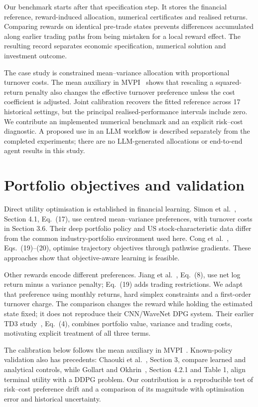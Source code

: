 \documentclass[sigconf,review]{acmart}
\begin{document}
Our benchmark starts after that specification step. It stores the financial reference, reward-induced allocation, numerical certificates and realised returns. Comparing rewards on identical pre-trade states prevents differences accumulated along earlier trading paths from being mistaken for a local reward effect. The resulting record separates economic specification, numerical solution and investment outcome.

The case study is constrained mean--variance allocation with proportional turnover costs. The mean auxiliary in MVPI\ \cite{zhang2021} shows that rescaling a squared-return penalty also changes the effective turnover preference unless the cost coefficient is adjusted. Joint calibration recovers the fitted reference across 17 historical settings, but the principal realised-performance intervals include zero. We contribute an implemented numerical benchmark and an explicit risk--cost diagnostic. A proposed use in an LLM workflow is described separately from the completed experiments; there are no LLM-generated allocations or end-to-end agent results in this study.

\section{Portfolio objectives and validation}
Direct utility optimisation is established in financial learning. Simon et al.\ \cite{simon2026}, Section 4.1, Eq.\ (17), use centred mean--variance preferences, with turnover costs in Section 3.6. Their deep portfolio policy and US stock-characteristic data differ from the common industry-portfolio environment used here. Cong et al.\ \cite{cong2026}, Eqs.\ (19)--(20), optimise trajectory objectives through pathwise gradients. These approaches show that objective-aware learning is feasible.

Other rewards encode different preferences. Jiang et al.\ \cite{jiang2025}, Eq.\ (8), use net log return minus a variance penalty; Eq.\ (19) adds trading restrictions. We adapt that preference using monthly returns, hard simplex constraints and a first-order turnover charge. The comparison changes the reward while holding the estimated state fixed; it does not reproduce their CNN/WaveNet DPG system. Their earlier TD3 study\ \cite{jiang2024}, Eq.\ (4), combines portfolio value, variance and trading costs, motivating explicit treatment of all three terms.

The calibration below follows the mean auxiliary in MVPI\ \cite{zhang2021}. Known-policy validation also has precedents: Chaouki et al.\ \cite{chaouki2020}, Section 3, compare learned and analytical controls, while Gollart and Okhrin\ \cite{gollart2025}, Section 4.2.1 and Table 1, align terminal utility with a DDPG problem. Our contribution is a reproducible test of risk--cost preference drift and a comparison of its magnitude with optimisation error and historical uncertainty.
\end{document}
